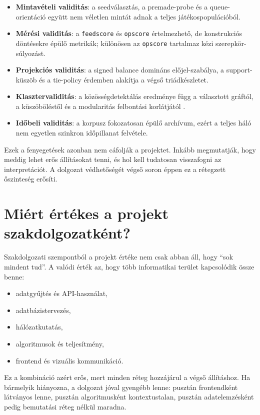 \documentclass[a4paper,12pt]{report}
\begin{document}
\begin{itemize}
    \item \textbf{Mintavételi validitás}: a seedválasztás, a premade-probe és a queue-orientáció együtt nem véletlen mintát adnak a teljes játékospopulációból.
    \item \textbf{Mérési validitás}: a \texttt{feedscore} és \texttt{opscore} értelmezhető, de konstrukciós döntésekre épülő metrikák; különösen az \texttt{opscore} tartalmaz kézi szerepkör-súlyozást.
    \item \textbf{Projekciós validitás}: a signed balance domináns előjel-szabálya, a support-küszöb és a tie-policy érdemben alakítja a végső triádkészletet.
    \item \textbf{Klasztervaliditás}: a közösségdetektálás eredménye függ a választott gráftól, a küszöböléstől és a modularitás felbontási korlátjától \cite{fortunato_barthelemy2007}.
    \item \textbf{Időbeli validitás}: a korpusz fokozatosan épülő archívum, ezért a teljes háló nem egyetlen szinkron időpillanat felvétele.
\end{itemize}

Ezek a fenyegetések azonban nem cáfolják a projektet. Inkább megmutatják, hogy meddig lehet erős állításokat tenni, és hol kell tudatosan visszafogni az interpretációt. A dolgozat védhetőségét végső soron éppen ez a rétegzett őszinteség erősíti.

\section{Miért értékes a projekt szakdolgozatként?}

Szakdolgozati szempontból a projekt értéke nem csak abban áll, hogy ``sok mindent tud''. A valódi érték az, hogy több informatikai terület kapcsolódik össze benne:

\begin{itemize}
    \item adatgyűjtés és API-használat,
    \item adatbázistervezés,
    \item hálózatkutatás,
    \item algoritmusok és teljesítmény,
    \item frontend és vizuális kommunikáció.
\end{itemize}

Ez a kombináció azért erős, mert minden réteg hozzájárul a végső állításhoz. Ha bármelyik hiányozna, a dolgozat jóval gyengébb lenne: pusztán frontendként látványos lenne, pusztán algoritmusként kontextustalan, pusztán adatelemzésként pedig bemutatási réteg nélkül maradna.
\end{document}
